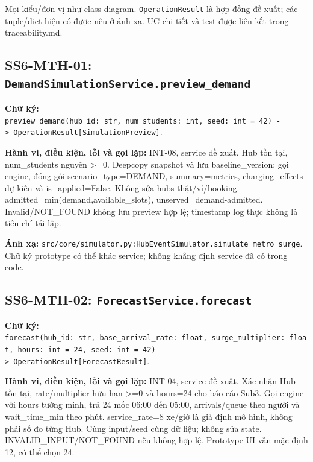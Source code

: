 \documentclass[11pt,a4paper]{article}
\begin{document}
Mọi kiểu/đơn vị như class diagram. \texttt{OperationResult} là hợp đồng
đề xuất; các tuple/dict hiện có được nêu ở ánh xạ. UC chi tiết và test
được liên kết trong traceability.md.

\hypertarget{ss6-mth-01-demandsimulationservice.preview_demand}{%
\subsection{\texorpdfstring{SS6-MTH-01:
\texttt{DemandSimulationService.preview\_demand}}{SS6-MTH-01: DemandSimulationService.preview\_demand}}\label{ss6-mth-01-demandsimulationservice.preview_demand}}

\textbf{Chữ ký:}
\texttt{preview\_demand(hub\_id:\ str,\ num\_students:\ int,\ seed:\ int\ =\ 42)\ -\textgreater{}\ OperationResult{[}SimulationPreview{]}}.

\textbf{Hành vi, điều kiện, lỗi và gọi lặp:} INT-08, service đề xuất.
Hub tồn tại, num\_students nguyên \textgreater=0. Deepcopy snapshot và
lưu baseline\_version; gọi engine, đóng gói scenario\_type=DEMAND,
summary=metrics, charging\_effects dự kiến và is\_applied=False. Không
sửa hubs thật/ví/booking. admitted=min(demand,available\_slots),
unserved=demand-admitted. Invalid/NOT\_FOUND không lưu preview hợp lệ;
timestamp log thực không là tiêu chí tái lập.

\textbf{Ánh xạ:}
\texttt{src/core/simulator.py:HubEventSimulator.simulate\_metro\_surge}.
Chữ ký prototype có thể khác service; không khẳng định service đã có
trong code.

\hypertarget{ss6-mth-02-forecastservice.forecast}{%
\subsection{\texorpdfstring{SS6-MTH-02:
\texttt{ForecastService.forecast}}{SS6-MTH-02: ForecastService.forecast}}\label{ss6-mth-02-forecastservice.forecast}}

\textbf{Chữ ký:}
\texttt{forecast(hub\_id:\ str,\ base\_arrival\_rate:\ float,\ surge\_multiplier:\ float,\ hours:\ int\ =\ 24,\ seed:\ int\ =\ 42)\ -\textgreater{}\ OperationResult{[}ForecastResult{]}}.

\textbf{Hành vi, điều kiện, lỗi và gọi lặp:} INT-04, service đề xuất.
Xác nhận Hub tồn tại, rate/multiplier hữu hạn \textgreater=0 và hours=24
cho báo cáo Sub3. Gọi engine với hours tường minh, trả 24 mốc 06:00 đến
05:00, arrivals/queue theo người và wait\_time\_min theo phút.
service\_rate=8 xe/giờ là giả định mô hình, không phải số đo từng Hub.
Cùng input/seed cùng dữ liệu; không sửa state. INVALID\_INPUT/NOT\_FOUND
nếu không hợp lệ. Prototype UI vẫn mặc định 12, có thể chọn 24.
\end{document}
